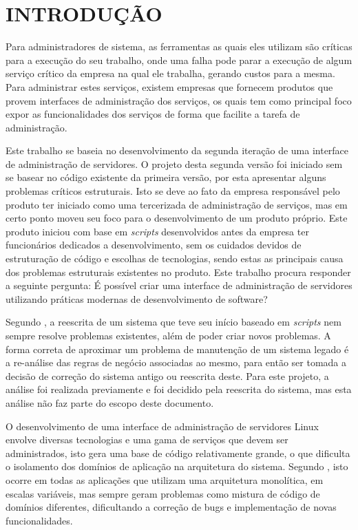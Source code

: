 \chapter{INTRODUÇÃO}
\label{chp:intro}

Para administradores de sistema, as ferramentas as quais eles utilizam são
críticas para a execução do seu trabalho, onde uma falha pode parar a execução
de algum serviço crítico da empresa na qual ele trabalha, gerando custos para
a mesma. Para administrar estes serviços, existem empresas que fornecem
produtos que provem interfaces de administração dos serviços, os quais tem
como principal foco expor as funcionalidades dos serviços de forma que
facilite a tarefa de administração.

Este trabalho se baseia no desenvolvimento da segunda iteração de uma
interface de administração de servidores. O projeto desta segunda versão
foi iniciado sem se basear no código existente da primeira versão, por esta
apresentar alguns problemas críticos estruturais. Isto se deve ao fato da
empresa responsável pelo produto ter iniciado como uma tercerizada de
administração de serviços, mas em certo ponto moveu seu foco para o
desenvolvimento de um produto próprio. Este produto iniciou com base em
\emph{scripts} desenvolvidos antes da empresa ter funcionários dedicados a
desenvolvimento, sem os cuidados devidos de estruturação de código e escolhas
de tecnologias, sendo estas as principais causa dos problemas estruturais
existentes no produto. Este trabalho procura responder a seguinte pergunta:
É possível criar uma interface de administração de servidores utilizando
práticas modernas de desenvolvimento de software?

Segundo , a reescrita de um sistema que teve seu
início baseado em \emph{scripts} nem sempre resolve problemas existentes,
além de poder criar novos problemas. A forma correta de aproximar um problema
de manutenção de um sistema legado é a re-análise das regras de negócio
associadas ao mesmo, para então ser tomada a decisão de correção do sistema
antigo ou reescrita deste. Para este projeto, a análise foi realizada
previamente e foi decidido pela reescrita do sistema, mas esta análise
não faz parte do escopo deste documento.

O desenvolvimento de uma interface de administração de servidores Linux
envolve diversas tecnologias e uma gama de serviços que devem ser
administrados, isto gera uma base de código relativamente grande, o que
dificulta o isolamento dos domínios de aplicação na arquitetura
do sistema. Segundo , isto ocorre em todas as aplicações
que utilizam uma arquitetura monolítica, em escalas variáveis, mas sempre
geram problemas como mistura de código de domínios diferentes, dificultando
a correção de bugs e implementação de novas funcionalidades.

